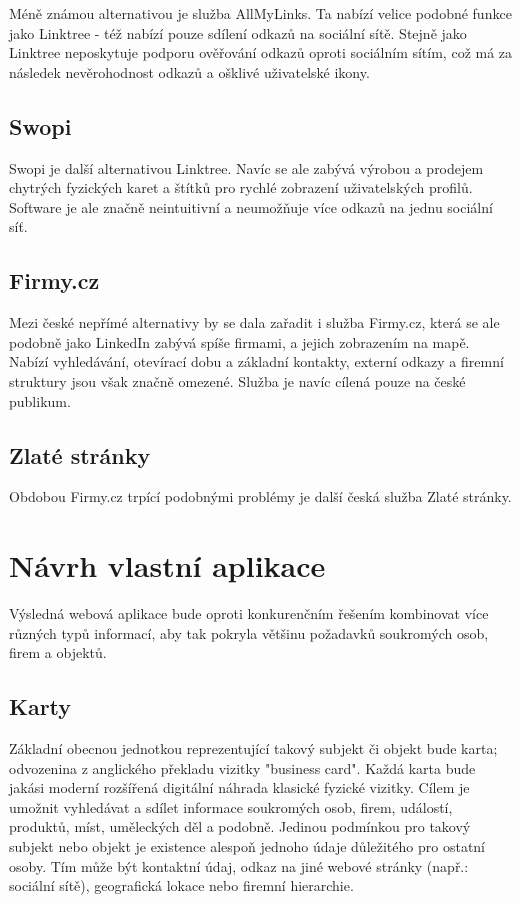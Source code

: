 	Méně známou alternativou je služba AllMyLinks.
	Ta nabízí velice podobné funkce jako Linktree - též nabízí pouze sdílení odkazů na sociální sítě.
	Stejně jako Linktree neposkytuje podporu ověřování odkazů oproti sociálním sítím, což má za následek
	nevěrohodnost odkazů a ošklivé uživatelské ikony.

	\subsection{Swopi}

	Swopi je další alternativou Linktree.
	Navíc se ale zabývá výrobou a prodejem chytrých fyzických karet a štítků pro rychlé zobrazení uživatelských profilů.
	Software je ale značně neintuitivní a neumožňuje více odkazů na jednu sociální síť.

	\subsection{Firmy.cz}

	Mezi české nepřímé alternativy by se dala zařadit i služba Firmy.cz, která se ale podobně jako LinkedIn zabývá
	spíše firmami, a jejich zobrazením na mapě.
	Nabízí vyhledávání, otevírací dobu a základní kontakty, externí odkazy a firemní struktury jsou však značně omezené.
	Služba je navíc cílená pouze na české publikum.

	\subsection{Zlaté stránky}

	Obdobou Firmy.cz trpící podobnými problémy je další česká služba Zlaté stránky.

\section{Návrh vlastní aplikace}

Výsledná webová aplikace bude oproti konkurenčním řešením kombinovat více různých typů informací, aby tak pokryla
většinu požadavků soukromých osob, firem a objektů.

	\subsection{Karty}

	Základní obecnou jednotkou reprezentující takový subjekt či objekt bude karta; odvozenina z anglického překladu vizitky "business card".
	Každá karta bude jakási moderní rozšířená digitální náhrada klasické fyzické vizitky.
	Cílem je umožnit vyhledávat a sdílet informace soukromých osob, firem, událostí, produktů, míst, uměleckých děl a podobně.
	Jedinou podmínkou pro takový subjekt nebo objekt je existence alespoň jednoho údaje důležitého pro ostatní osoby.
	Tím může být kontaktní údaj, odkaz na jiné webové stránky (např.: sociální sítě), geografická lokace nebo
	firemní hierarchie.

